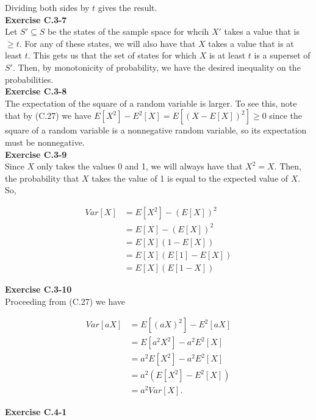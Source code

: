 \documentclass{article}
\begin{document}
Dividing both sides by $t$ gives the result. \\

\noindent\textbf{Exercise C.3-7}\\

Let $S' \subseteq S$ be the states of the sample space for whcih $X'$ takes a value that is $\ge t$.  For any of these states, we will also have that $X$ takes a value that is at least $t$. This gets us that the set of states for which $X$ is at least $t$ is a superset of $S'$. Then, by monotonicity of probability, we have the desired inequality on the probabilities.\\


\noindent\textbf{Exercise C.3-8}\\

The expectation of the square of a random variable is larger.  To see this, note that by (C.27) we have $E[X^2] - E^2[X] = E[(X-E[X])^2] \geq 0$ since the square of a random variable is a nonnegative random variable, so its expectation must be nonnegative. \\

\noindent\textbf{Exercise C.3-9}\\

Since $X$ only takes the values 0 and 1, we will always have that $X^2 = X$. Then, the probability that $X$ takes the value of 1 is equal to the expected value of $X$. So,

\begin{align*}
Var[X ] &=E[X^2] - (E[X])^2\\
&= E[X] - (E[X])^2 \\
&= E[X] (1-E[X])\\
&= E[X] (E[1]-E[X])\\
&= E[X] (E[1-X])
\end{align*}

\noindent\textbf{Exercise C.3-10}\\

Proceeding from (C.27) we have

\begin{align*}
Var[aX] &= E[(aX)^2] - E^2[aX] \\
&= E[a^2X^2] - a^2E^2[X] \\
&= a^2E[X^2] - a^2E^2[X]\\
&=a^2(E[X^2] - E^2[X])\\
&= a^2Var[X].
\end{align*}

\noindent\textbf{Exercise C.4-1}\\
\end{document}
